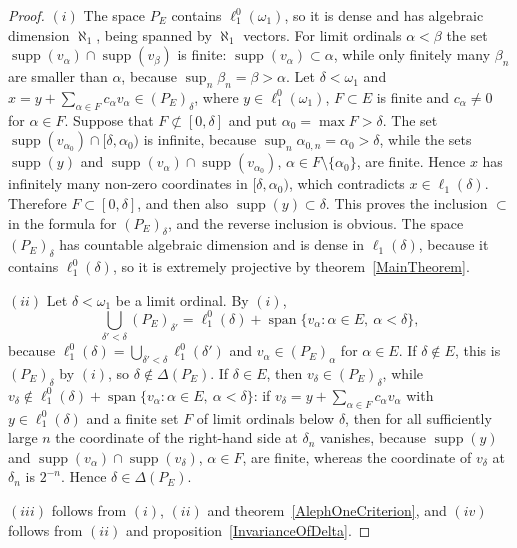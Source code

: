 \documentclass[12pt]{article}
\newcommand{\lo}[1]{\ell_1^0(#1)}
\newcommand{\ellone}[1]{\ell_1(#1)}
\newcommand{\supp}{\operatorname{supp}}
\newcommand{\Lin}{\operatorname{span}}
\begin{document}
\begin{proof} $(i)$ The space $P_E$ contains $\lo{\omega_1}$, so it is dense
    and has algebraic dimension $\aleph_1$, being spanned by $\aleph_1$
    vectors. For limit ordinals $\alpha<\beta$
    the set $\supp(v_\alpha)\cap\supp(v_\beta)$ is finite:
    $\supp(v_\alpha)\subset\alpha$, while only finitely many $\beta_n$ are
    smaller than $\alpha$, because $\sup_n\beta_n=\beta>\alpha$. Let
    $\delta<\omega_1$ and $x=y+\sum_{\alpha\in F}c_\alpha v_\alpha\in(P_E)_\delta$,
    where $y\in\lo{\omega_1}$, $F\subset E$ is finite and $c_\alpha\neq 0$ for
    $\alpha\in F$. Suppose that $F\not\subset[0,\delta]$ and put
    $\alpha_0=\max F>\delta$. The set $\supp(v_{\alpha_0})\cap[\delta,\alpha_0)$
    is infinite, because $\sup_n\alpha_{0,n}=\alpha_0>\delta$, while the sets
    $\supp(y)$ and $\supp(v_\alpha)\cap\supp(v_{\alpha_0})$,
    $\alpha\in F\setminus\{\alpha_0\}$, are finite. Hence $x$ has infinitely
    many non-zero coordinates in $[\delta,\alpha_0)$, which contradicts
    $x\in\ellone{\delta}$. Therefore $F\subset[0,\delta]$, and then also
    $\supp(y)\subset\delta$. This proves the inclusion $\subset$ in the
    formula for $(P_E)_\delta$, and the reverse inclusion is obvious. The
    space $(P_E)_\delta$ has countable algebraic dimension and is dense in
    $\ellone{\delta}$, because it contains $\lo{\delta}$, so it is extremely
    projective by theorem~\ref{MainTheorem}.

    $(ii)$ Let $\delta<\omega_1$ be a limit ordinal. By $(i)$,
    \[
    \bigcup_{\delta'<\delta}(P_E)_{\delta'}=\lo{\delta}+\Lin\{v_\alpha:\alpha\in E,\ \alpha<\delta\},
    \]
    because $\lo{\delta}=\bigcup_{\delta'<\delta}\lo{\delta'}$ and
    $v_\alpha\in(P_E)_\alpha$ for $\alpha\in E$. If $\delta\notin E$, this is
    $(P_E)_\delta$ by $(i)$, so $\delta\notin\Delta(P_E)$. If $\delta\in E$,
    then $v_\delta\in(P_E)_\delta$, while
    $v_\delta\notin\lo{\delta}+\Lin\{v_\alpha:\alpha\in E,\ \alpha<\delta\}$:
    if $v_\delta=y+\sum_{\alpha\in F}c_\alpha v_\alpha$ with $y\in\lo{\delta}$
    and a finite set $F$ of limit ordinals below $\delta$, then for all
    sufficiently large $n$ the coordinate of the right-hand side at
    $\delta_n$ vanishes, because $\supp(y)$ and $\supp(v_\alpha)\cap\supp(v_\delta)$,
    $\alpha\in F$, are finite, whereas the coordinate of $v_\delta$ at
    $\delta_n$ is $2^{-n}$. Hence $\delta\in\Delta(P_E)$.

    $(iii)$ follows from $(i)$, $(ii)$ and theorem~\ref{AlephOneCriterion}, and
    $(iv)$ follows from $(ii)$ and proposition~\ref{InvarianceOfDelta}.


\end{proof}
\end{document}
